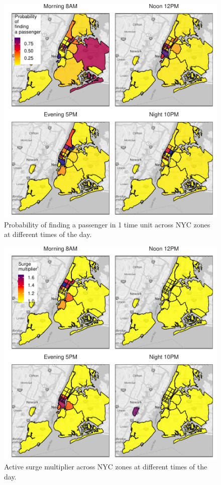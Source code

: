 \begin{figure}[hb]
	\includegraphics{figures/successful_heatmap.pdf}
	\caption{Probability of finding a passenger in 1 time unit across NYC zones at different times of the day.}
	\label{fig:successful_heatmap}
\end{figure}

\begin{figure}[hb]
	\includegraphics{figures/surge_heatmap.pdf}
	\caption{Active surge multiplier across NYC zones at different times of the day.}
	\label{fig:surge_heatmap}
\end{figure}

